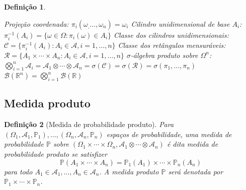 \documentclass[12pt,a4paper,answers]{article}
\numberwithin{equation}{section} %
\newcommand{\inv}[1]{#1^{-1}}      %
\renewcommand{\Re}{\mathbb{R}}
\newcommand{\Bo}{\mathcal{B}(\Re)} 				%
\newcommand{\Born}{\mathcal{B}(\Re^n)} 			%
\newcommand{\Acal}{\mathcal{A}}
\newcommand{\Ccal}{\mathcal{C}}
\newcommand{\Rcal}{\mathcal{R}}
\newcommand{\sig}{$\sigma$}
\theoremstyle{thm_estilo}
\newtheorem{definition}{Definição}[section]
\theoremstyle{thm_note_est}
\begin{document}
\begin{definition}
	\leavevmode
	\begin{outline}[enumerate]
		\1 \textit{Projeção coordenada}: \(\pi_i(\omega_, \ldots, \omega_n) = \omega_i \)
		\1 \textit{Cilindro unidimensional de base $A_i$}: \( \inv{\pi_i}(A_i) = \{ \omega\in\Omega : \pi_i(\omega)\in A_i\} \) 
		\1 \textit{Classe dos cilindros unidimensionais}: \( \Ccal = \{\inv{\pi_i}(A_i) : A_i \in \Acal, i=1,\ldots,n\}\)
		\1 \textit{Classe dos retângulos mensuráveis}: \( \Rcal = \{A_1\times\cdots\times A_n : A_i \in \Acal, i=1,\ldots,n\}\)
		\1 \textit{\sig-álgebra produto sobre $\Omega^n$}: 
		\(\bigotimes_{i=1}^n \mathcal{A}_i = \mathcal{A}_1 \otimes \cdots \otimes \mathcal{A}_n = \sigma(\mathcal{C}) = \sigma(\Rcal) = \sigma(\pi_1, \ldots,\pi_n)\)
		\1 \( \Born = \bigotimes_{i=1}^n \Bo\)
	\end{outline}
\end{definition}

\subsection{Medida produto}

\begin{definition}[Medida de probabilidade produto]
	Para $(\Omega_1, \mathcal{A}_1, \mathbb{P}_1), \ldots, (\Omega_n, \mathcal{A}_n, \mathbb{P}_n)$ espaços de probabilidade, uma medida de probabilidade $\mathbb{P}$ sobre $(\Omega_1 \times \cdots \times \Omega_n, \mathcal{A}_1 \otimes \cdots \otimes \mathcal{A}_n)$ é dita \textit{medida de probabilidade produto} se satisfizer
	\begin{equation}
		\mathbb{P}(A_1 \times \cdots \times A_n) = \mathbb{P}_1(A_1) \times \cdots \times \mathbb{P}_n(A_n)
	\end{equation}
	para todo $A_1 \in \mathcal{A}_1, \ldots, A_n \in \mathcal{A}_n$. A medida produto $\mathbb{P}$ será denotada por $\mathbb{P}_1 \times \cdots \times \mathbb{P}_n$.
\end{definition}
\end{document}

